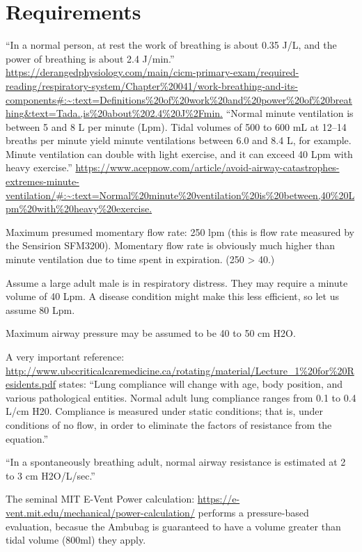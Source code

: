 \documentclass{article}
\begin{document}
\section{Requirements}

``In a normal person, at rest the work of breathing is about 0.35 J/L, and the power of breathing is about 2.4 J/min.''
\url{https://derangedphysiology.com/main/cicm-primary-exam/required-reading/respiratory-system/Chapter%20041/work-breathing-and-its-components#:~:text=Definitions%20of%20work%20and%20power%20of%20breathing&text=Tada.,is%20about%202.4%20J%2Fmin.}
  ``Normal minute ventilation is between 5 and 8 L per minute (Lpm). Tidal volumes of 500 to 600 mL at 12–14 breaths per minute yield minute ventilations between 6.0 and 8.4 L, for example. Minute ventilation can double with light exercise, and it can exceed 40 Lpm with heavy exercise.''
  \url{https://www.acepnow.com/article/avoid-airway-catastrophes-extremes-minute-ventilation/#:~:text=Normal%20minute%20ventilation%20is%20between,40%20Lpm%20with%20heavy%20exercise.}

    Maximum presumed momentary flow rate: 250 lpm (this is flow rate measured by the Sensirion SFM3200). Momentary flow rate is obviously much higher than minute ventilation
    due to time spent in expiration. (250 > 40.)

    Assume a large adult male is in respiratory distress. They may require a minute volume of 40 Lpm. A disease condition might make this less efficient, so let us
    assume 80 Lpm.

    Maximum airway pressure may be assumed to be 40 to 50 cm H2O.

    A very important reference:   \url{http://www.ubccriticalcaremedicine.ca/rotating/material/Lecture_1%20for%20Residents.pdf}
      states:
      ``Lung compliance will change with age, body position, and various pathological
entities. Normal adult lung compliance ranges from 0.1 to 0.4 L/cm H20. Compliance is
measured under static conditions; that is, under conditions of no flow, in order to
eliminate the factors of resistance from the equation.''

``In a spontaneously breathing adult, normal airway resistance is estimated at 2 to 3
cm H2O/L/sec.''

The seminal MIT E-Vent Power calculation: \url{https://e-vent.mit.edu/mechanical/power-calculation/} performs
a pressure-based evaluation, becasue the Ambubag is guaranteed to have a volume greater than tidal volume (800ml) they apply.
\end{document}
